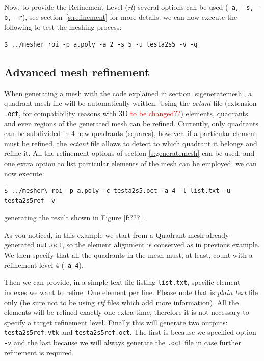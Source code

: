 \documentclass[10pt]{article}
\begin{document}
Now, to provide the Refinement Level (\textit{rl}) several options can be used (\texttt{-a, -s, -b, -r}), see section~\ref{s:refinement} for more details.
we can now execute the following to test the meshing process:
{\small
\begin{verbatim}
$ ../mesher_roi -p a.poly -a 2 -s 5 -u testa2s5 -v -q
\end{verbatim}
}
\subsection{Advanced mesh refinement}
\label{refinemesh}

When generating a mesh with the code explained in section \ref{s:generatemesh}, a quadrant mesh file will be automatically written. Using the \textit{octant} file (extension \texttt{.oct}, for compatibility reasons with 3D \textcolor{red}{to be changed??}) elements, quadrants and even regions of the generated mesh can be refined. Currently, only quadrants can be subdivided in 4 new quadrants (squares), however, if a particular element must be refined, the \textit{octant} file allows to detect to which quadrant it belongs and refine it. All the refinement options of section \ref{s:generatemesh} can be used, and one extra option to list particular elements of the mesh can be employed.
we can now execute: 
{\small
\begin{verbatim}
$ ../mesher\_roi -p a.poly -c testa2s5.oct -a 4 -l list.txt -u testa2s5ref -v
\end{verbatim}
}
generating the result shown in Figure \ref{f:???}.

As you noticed, in this example we start from a Quadrant mesh already generated \texttt{out.oct}, so the element alignment is conserved as in previous example. We then specify that all the quadrants in the mesh must, at least, count with a refinement level 4 (\texttt{-a 4}). 

Then we can provide, in a simple text file listing \texttt{list.txt}, specific element indexes we want to refine. One element per line. Please note that is \textit{plain text} file only (be sure not to be using \textit{rtf} files which add more information).
All the elements will be refined exactly one extra time, therefore it is not necessary to specify a target refinement level. Finally this will generate two outputs: \texttt{testa2s5ref.vtk} and \texttt{testa2s5ref.oct}. The first is because we specified option \texttt{-v} and the last because we will always generate the \texttt{.oct} file in case further refinement is required. 
%
%
\end{document}
